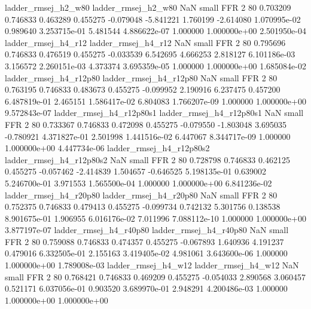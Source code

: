      ladder_rmsej_h2_w80      ladder_rmsej_h2_w80                   NaN      small      FFR                 2 80 0.703209       0.746833 0.463289       0.455275   -0.079048     -5.841221      1.760199    -2.614080   1.070995e-02  0.989640 3.253715e-01     5.481544   4.886622e-07            1.000000    1.000000e+00        2.501950e-04
     ladder_rmsej_h4_r12      ladder_rmsej_h4_r12                   NaN      small      FFR                 2 80 0.795696       0.746833 0.476519       0.455275   -0.033539      6.542695      4.666253     2.818127   6.101186e-03  3.156572 2.260151e-03     4.373374   3.695359e-05            1.000000    1.000000e+00        1.685084e-02
  ladder_rmsej_h4_r12p80   ladder_rmsej_h4_r12p80                   NaN      small      FFR                 2 80 0.763195       0.746833 0.483673       0.455275   -0.099952      2.190916      6.237475     0.457200   6.487819e-01  2.465151 1.586417e-02     6.804083   1.766207e-09            1.000000    1.000000e+00        9.572843e-07
ladder_rmsej_h4_r12p80s1 ladder_rmsej_h4_r12p80s1                   NaN      small      FFR                 2 80 0.733367       0.746833 0.472098       0.455275   -0.079550     -1.803048      3.695035    -0.780921   4.371827e-01  2.501998 1.441516e-02     6.447067   8.344717e-09            1.000000    1.000000e+00        4.447734e-06
ladder_rmsej_h4_r12p80s2 ladder_rmsej_h4_r12p80s2                   NaN      small      FFR                 2 80 0.728798       0.746833 0.462125       0.455275   -0.057462     -2.414839      1.504657    -0.646525   5.198135e-01  0.639002 5.246700e-01     3.971553   1.565500e-04            1.000000    1.000000e+00        6.841236e-02
  ladder_rmsej_h4_r20p80   ladder_rmsej_h4_r20p80                   NaN      small      FFR                 2 80 0.752375       0.746833 0.479413       0.455275   -0.099734      0.742132      5.301756     0.138538   8.901675e-01  1.906955 6.016176e-02     7.011996   7.088112e-10            1.000000    1.000000e+00        3.877197e-07
  ladder_rmsej_h4_r40p80   ladder_rmsej_h4_r40p80                   NaN      small      FFR                 2 80 0.759088       0.746833 0.474357       0.455275   -0.067893      1.640936      4.191237     0.479016   6.332505e-01  2.155163 3.419405e-02     4.981061   3.643600e-06            1.000000    1.000000e+00        1.789008e-03
     ladder_rmsej_h4_w12      ladder_rmsej_h4_w12                   NaN      small      FFR                 2 80 0.768421       0.746833 0.469209       0.455275   -0.054033      2.890568      3.060457     0.521171   6.037056e-01  0.903520 3.689970e-01     2.948291   4.200486e-03            1.000000    1.000000e+00        1.000000e+00
